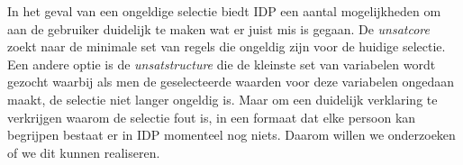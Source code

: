 In het geval van een ongeldige selectie biedt IDP een aantal mogelijkheden om aan de gebruiker duidelijk te maken wat er juist mis is gegaan. De \emph{unsatcore} zoekt naar de minimale set van regels die ongeldig zijn voor de huidige selectie. Een andere optie is de \emph{unsatstructure} die de kleinste set van variabelen wordt gezocht waarbij als 
men de geselecteerde waarden voor deze variabelen ongedaan maakt, de selectie niet langer ongeldig is. 
Maar om een duidelijk verklaring te verkrijgen waarom de selectie fout is, in een formaat dat elke persoon kan begrijpen bestaat er in IDP momenteel nog niets. Daarom willen we onderzoeken of we dit kunnen realiseren.

